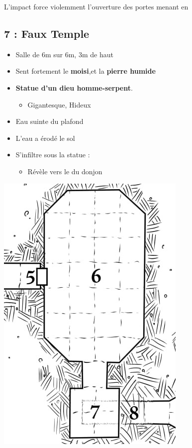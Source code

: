 L’impact force violemment l’ouverture des portes menant en \textbf{}

\subsection{7 : Faux Temple}\label{n1:s7}
\begin{itemize}
  \item Salle de 6m sur 6m, 3m de haut
  \item Sent  fortement le \textbf{moisi},et la \textbf{pierre humide}
  \item \textbf{Statue d’un dieu homme-serpent}.
  \begin{itemize}
    \item Gigantesque, Hideux
  \end{itemize}
  \item Eau suinte du plafond
  \item L'eau a érodé le sol
  \item S'infiltre sous la statue :
  \begin{itemize}
    \item Révèle \textbf{} vers le \textbf{} du donjon
  \end{itemize}
\end{itemize}
\vfill

\begin{center}
  \includegraphics[width=\columnwidth]{pics/map_5-8.jpg}
\end{center}
